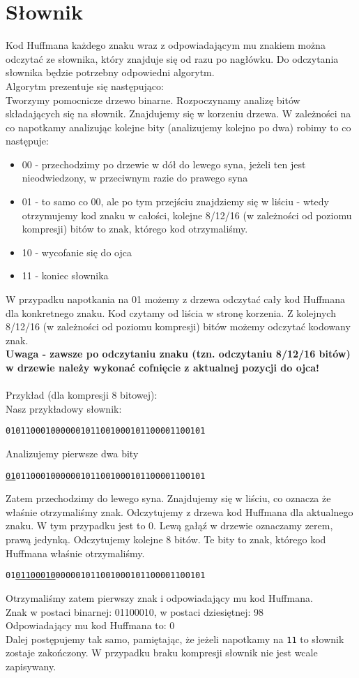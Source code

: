 \documentclass[]{article}
\begin{document}
\section{Słownik}\label{header-n279}
Kod Huffmana każdego znaku wraz z odpowiadającym mu znakiem można odczytać ze słownika, który znajduje się od razu po nagłówku. Do odczytania słownika będzie potrzebny odpowiedni algorytm.\\
Algorytm prezentuje się następująco:\\
Tworzymy pomocnicze drzewo binarne. Rozpoczynamy analizę bitów składających się na słownik. Znajdujemy się w korzeniu drzewa. W zależności na co napotkamy analizując kolejne bity (analizujemy kolejno po dwa) robimy to co następuje:
\begin{itemize}
    \item 00 - przechodzimy po drzewie w dół do lewego syna, jeżeli ten jest nieodwiedzony, w przeciwnym razie do prawego syna
   \item  01 - to samo co 00, ale po tym przejściu znajdziemy się w liściu - wtedy otrzymujemy kod znaku w całości, kolejne 8/12/16 (w zależności od poziomu kompresji) bitów to znak, którego kod otrzymaliśmy.
   \item  10 - wycofanie się do ojca
   \item  11 - koniec słownika
\end{itemize}
W przypadku napotkania na 01 możemy z drzewa odczytać cały kod Huffmana dla konkretnego znaku. Kod czytamy od liścia w stronę korzenia. Z kolejnych 8/12/16 (w zależności od poziomu kompresji) bitów możemy odczytać kodowany znak. \\
\textbf{Uwaga - zawsze po odczytaniu znaku (tzn. odczytaniu 8/12/16 bitów) w drzewie należy wykonać cofnięcie z aktualnej pozycji do ojca!}
\\\\Przykład (dla kompresji 8 bitowej): \\
Nasz przykładowy słownik:
\begin{center}
\texttt{0101100010000001011001000101100001100101}
\end{center}
Analizujemy pierwsze dwa bity
\begin{center}
\texttt{\underline{01}01100010000001011001000101100001100101}
\end{center}
Zatem przechodzimy do lewego syna. Znajdujemy się w liściu, co oznacza że właśnie otrzymaliśmy znak. Odczytujemy z drzewa kod Huffmana dla aktualnego znaku. W tym przypadku jest to 0. Lewą gałąź w drzewie oznaczamy zerem, prawą jedynką.
Odczytujemy kolejne 8 bitów. Te bity to znak, którego kod Huffmana właśnie otrzymaliśmy.
\begin{center}
\texttt{01\underline{01100010}000001011001000101100001100101}
\end{center}
Otrzymaliśmy zatem pierwszy znak i odpowiadający mu kod Huffmana.\\
Znak w postaci binarnej: 01100010, w postaci dziesiętnej: 98\\
Odpowiadający mu kod Huffmana to: 0\\
Dalej postępujemy tak samo, pamiętając, że jeżeli napotkamy na \texttt{11} to słownik zostaje zakończony. W przypadku braku kompresji słownik nie jest wcale zapisywany.
\end{document}
